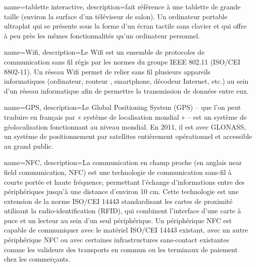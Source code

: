  {
	name=tablette interactive,
	description={fait référence à une tablette de grande taille (environ la surface d’un téléviseur de salon). Un ordinateur portable ultraplat qui se présente sous la forme d'un écran tactile sans clavier et qui offre à peu près les mêmes fonctionnalités qu'un ordinateur personnel.}
}

 {
	name=Wifi,
	description={Le Wifi est un ensemble de protocoles de communication sans fil régis par les normes du groupe IEEE 802.11 (ISO/CEI 8802-11). Un réseau Wifi permet de relier sans fil plusieurs appareils informatiques (ordinateur, routeur , smartphone, décodeur Internet, etc.) au sein d'un réseau informatique afin de permettre la transmission de données entre eux.}
}

 {
	name=GPS,
	description={Le Global Positioning System (GPS) – que l'on peut traduire en français par « système de localisation mondial » – est un système de géolocalisation fonctionnant au niveau mondial. En 2011, il est avec GLONASS, un système de positionnement par satellites entièrement opérationnel et accessible au grand public.}
}

 {
	name=NFC,
	description={La communication en champ proche (en anglais near field communication, NFC) est une technologie de communication sans-fil à courte portée et haute fréquence, permettant l'échange d'informations entre des périphériques jusqu'à une distance d'environ 10 cm. Cette technologie est une extension de la norme ISO/CEI 14443 standardisant les cartes de proximité utilisant la radio-identification (RFID), qui combinent l'interface d'une carte à puce et un lecteur au sein d'un seul périphérique. Un périphérique NFC est capable de communiquer avec le matériel ISO/CEI 14443 existant, avec un autre périphérique NFC ou avec certaines infrastructures sans-contact existantes comme les valideurs des transports en commun ou les terminaux de paiement chez les commerçants.}
}
